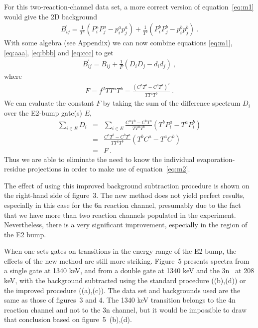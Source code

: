 For this two-reaction-channel data set, a more correct version of
equation~\ref{eq:m1} would give the 2D background
\begin{eqnarray}
B^{\prime}_{ij} =
         \frac {1}{T^a} (P^a_i P^a_j - p^a_i p^a_j) +
         \frac {1}{T^b} (P^b_i P^b_j - p^b_i p^b_j) \ .       \label{eq:ccc} 
\end{eqnarray}
With some algebra (see Appendix) we can now combine equations \ref{eq:m1}, 
\ref{eq:aaa}, \ref{eq:bbb} and \ref{eq:ccc} to get 
\begin{eqnarray}
B^{\prime}_{ij} = B_{ij} + \frac {1} {F} (D_i D_j - d_i d_j) \ ,  \label{eq:m2} 
\end{eqnarray}
where
\begin{eqnarray}
F = f^2 T T^a T^b = \frac {(C^aT^b - C^bT^a)^2} {TT^aT^b} \ .   \label{eq:FFF}
\end{eqnarray}
We can evaluate the constant $F$ by taking the sum of the difference spectrum
$D_i$ over the E2-bump gate(s) $E$,
\begin{eqnarray}
\sum_{i \in E} D_i & = & \sum_{i \in E}
          \frac {C^a T^b - C^b T^a} {T T^a T^b}
                (T^b P^a_i - T^a P^b_i)           \nonumber \\
    & = & \frac {C^a T^b - C^b T^a} {T T^a T^b}
                (T^b C^a - T^a C^b)               \nonumber \\
    & = & F \ .                                   \label{eq:m2b} 
\end{eqnarray}
Thus we are able to eliminate the need to know the individual
evaporation-residue projections in order to make use of equation~\ref{eq:m2}.

The effect of using this improved background subtraction procedure is shown on
the right-hand side of figure~3. The new method does not yield perfect results,
especially in this case for the 6n reaction channel, presumably due to the fact
that we have more than two reaction channels populated in the experiment.
Nevertheless, there is a very significant improvement, especially in the region
of the E2 bump.

When one sets gates on transitions in the energy range of the E2 bump, the
effects of the new method are still more striking. Figure~5 presents spectra
from a single gate at 1340 keV, and from a double gate at 1340 keV and the 3n
\gray\ at 208 keV, with the background subtracted using the standard procedure
((b),(d)) or the improved procedure ((a),(c)). The data set and backgrounds
used are the same as those of figures~3 and 4. The 1340 keV transition belongs
to the 4n reaction channel and not to the 3n channel, but it would be
impossible to draw that conclusion based on figure~5~(b),(d).

